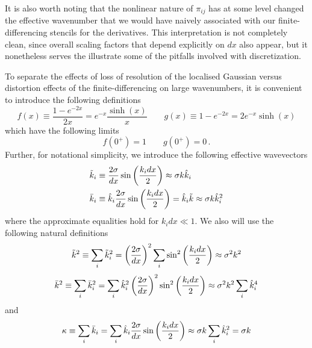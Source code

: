 \documentclass{revtex4}
\begin{document}
It is also worth noting that the nonlinear nature of $\pi_{ij}$ has at some level changed the effective wavenumber that we would have naively associated with our finite-differencing stencils for the derivatives.  This interpretation is not completely clean, since overall scaling factors that depend explicitly on $dx$ also appear, but it nonetheless serves the illustrate some of the pitfalls involved with discretization.

To separate the effects of loss of resolution of the localised Gaussian versus distortion effects of the finite-differencing on large wavenumbers, it is convenient to introduce the following definitions
\begin{equation}
  f(x) \equiv \frac{1-e^{-2x}}{2x} = e^{-x}\frac{\sinh(x)}{x} \qquad g(x) \equiv 1-e^{-2x} = 2e^{-x}\sinh(x)
\end{equation}
which have the following limits
\begin{equation}
  f(0^+) = 1 \qquad g(0^+) = 0 \, .
\end{equation}
Further, for notational simplicity, we introduce the following effective wavevectors
\begin{subequations}
\begin{align}
  \tilde{k}_i &\equiv \frac{2\sigma}{dx}\sin\left(\frac{k_idx}{2}\right) \approx \sigma k\hat{k}_i \\
  \bar{k}_i &\equiv \hat{k}_i\frac{2\sigma}{dx}\sin\left(\frac{k_idx}{2}\right) = \hat{k}_i\tilde{k} \approx \sigma k\hat{k}_i^2
\end{align}
\end{subequations}
where the approximate equalities hold for $k_idx \ll 1$.
We also will use the following natural definitions
\begin{equation}
  \tilde{k}^2 \equiv \sum_i\tilde{k}_i^2 = \left(\frac{2\sigma}{dx}\right)^2\sum_i\sin^2\left(\frac{k_idx}{2}\right) \approx \sigma^2k^2
\end{equation}
\begin{equation}
  \bar{k}^2 \equiv \sum_i\bar{k}_i^2 = \sum_i \hat{k}_i^2\left(\frac{2\sigma}{dx}\right)^2\sin^2\left(\frac{k_idx}{2}\right) \approx \sigma^2k^2\sum_i\hat{k}_i^4
\end{equation}
and
\begin{equation}
  \kappa \equiv \sum_i\bar{k}_i = \sum_i\hat{k}_i\frac{2\sigma}{dx}\sin\left(\frac{k_idx}{2}\right) \approx \sigma k\sum_i\hat{k}_i^2 = \sigma k
\end{equation}
\end{document}
